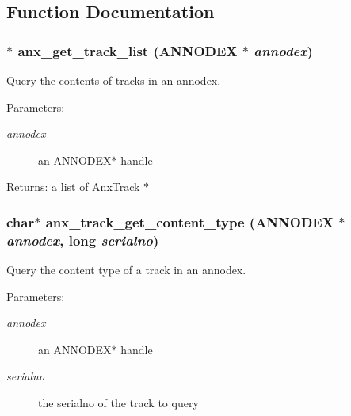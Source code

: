 \subsection{Function Documentation}
\subsubsection{$\ast$ anx\_\-get\_\-track\_\-list ({\bf ANNODEX} $\ast$ {\em annodex})}\label{anx__track_8h_a0}


Query the contents of tracks in an annodex. 

\begin{Desc}
\item[Parameters:]
\begin{description}
\item[{\em annodex}]an ANNODEX$\ast$ handle \end{description}
\end{Desc}
\begin{Desc}
\item[Returns:]a list of Anx\-Track $\ast$ \end{Desc}
\subsubsection{\setlength{\rightskip}{0pt plus 5cm}char$\ast$ anx\_\-track\_\-get\_\-content\_\-type ({\bf ANNODEX} $\ast$ {\em annodex}, long {\em serialno})}\label{anx__track_8h_a1}


Query the content type of a track in an annodex. 

\begin{Desc}
\item[Parameters:]
\begin{description}
\item[{\em annodex}]an ANNODEX$\ast$ handle \item[{\em serialno}]the serialno of the track to query \end{description}
\end{Desc}
